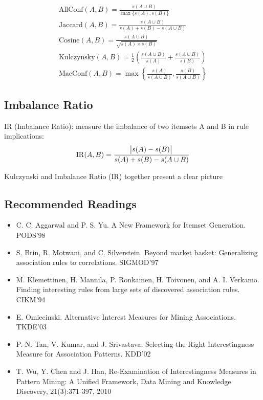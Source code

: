 \begin{gather*}
\mathrm{AllConf}(A, B) = \frac{s(A \cup B)}{\max\{s(A), s(B)\}} \\
\mathrm{Jaccard}(A, B) = \frac{s(A \cup B)}{s(A) + s(B) - s(A \cup B)} \\
\mathrm{Cosine}(A, B) = \frac{s(A \cup B)}{\sqrt{s(A) \times s(B)}} \\
\mathrm{Kulczynsky}(A, B) = \frac{1}{2}\left(\frac{s(A \cup B)}{s(A)} + \frac{s(A \cup B)}{s(B)}\right)\\
\mathrm{MacConf}(A, B)=\max\left\{\frac{s(A)}{s(A \cup B)}, \frac{s(B)}{s(A \cup B)}\right\}
\end{gather*}

\subsection{Imbalance Ratio}
IR (Imbalance Ratio): measure the imbalance of two itemsets A and B in rule implications:
\begin{equation*}
\mathrm{IR}(A, B)=\frac{\abs{s(A)-s(B)}}{s(A) + s(B) - s(A \cup B)}
\end{equation*}

Kulczynski and Imbalance Ratio (IR) together present a clear picture

\subsection{Recommended Readings}
\begin{itemize}
\item C. C. Aggarwal and P. S. Yu. A New Framework for Itemset Generation. PODS’98
\item S. Brin, R. Motwani, and C. Silverstein. Beyond market basket: Generalizing
association rules to correlations. SIGMOD'97
\item M. Klemettinen, H. Mannila, P. Ronkainen, H. Toivonen, and A. I. Verkamo. Finding interesting rules from large sets of discovered association rules. CIKM'94
\item E. Omiecinski. Alternative Interest Measures for Mining Associations. TKDE’03
\item P.-N. Tan, V. Kumar, and J. Srivastava. Selecting the Right Interestingness Measure for
Association Patterns. KDD'02
\item T. Wu, Y. Chen and J. Han, Re-Examination of Interestingness Measures in Pattern Mining: A Unified Framework, Data Mining and Knowledge Discovery, 21(3):371-397, 2010
\end{itemize}